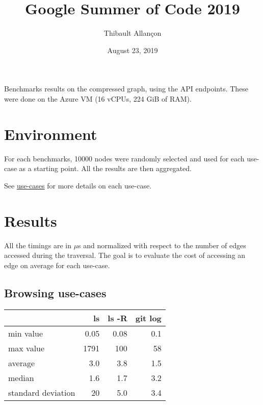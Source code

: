 \documentclass[11pt,a4paper]{article}
\title{Google Summer of Code 2019}
\author{Thibault Allançon}
\date{August 23, 2019}
\begin{document}
\maketitle

Benchmarks results on the compressed graph, using the API endpoints. These were
done on the Azure VM (16 vCPUs, 224 GiB of RAM).

\section{Environment}

For each benchmarks, 10000 nodes were randomly selected and used for each
use-case as a starting point. All the results are then aggregated.

See
\href{https://docs.softwareheritage.org/devel/swh-graph/use-cases.html}{use-cases}
for more details on each use-case.

\section{Results}

All the timings are in $\mu$s and normalized with respect to the number of edges
accessed during the traversal. The goal is to evaluate the cost of accessing an
edge on average for each use-case.

\subsection{Browsing use-cases}

\begin{center}
    \begin{tabular}{@{} l *3r @{}}
        \toprule
        \multicolumn{1}{c}{} &
            \textbf{ls} &
            \textbf{ls -R} &
            \textbf{git log} \\
        \midrule
        min value & 0.05 & 0.08 & 0.1 \\
        max value & 1791 & 100  & 58 \\
        average & 3.0 & 3.8 & 1.5 \\
        median & 1.6 & 1.7 & 3.2 \\
        standard deviation & 20 & 5.0 & 3.4 \\
        \bottomrule
    \end{tabular}
\end{center}

\vspace{0.5cm}
\end{document}
